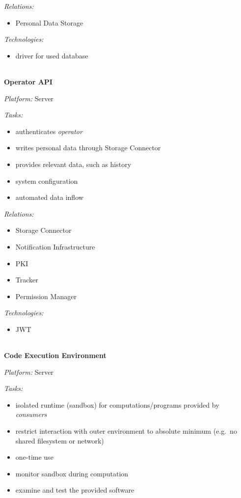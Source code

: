 \documentclass[12pt,english,a4paper,titlepage,cleardoublepage=empty,dottedtoc]{report}
\providecommand{\tightlist}{%
  \setlength{\itemsep}{0pt}\setlength{\parskip}{0pt}}
\begin{document}
\emph{Relations:}

\begin{itemize}
\tightlist
\item
  Personal Data Storage
\end{itemize}

\emph{Technologies:}

\begin{itemize}
\tightlist
\item
  driver for used database
\end{itemize}

~\\
\textbf{Operator API}

\emph{Platform:} Server

\emph{Tasks:}

\begin{itemize}
\tightlist
\item
  authenticates \emph{operator}
\item
  writes personal data through Storage Connector
\item
  provides relevant data, such as history
\item
  system configuration
\item
  automated data inflow
\end{itemize}

\emph{Relations:}

\begin{itemize}
\tightlist
\item
  Storage Connector
\item
  Notification Infrastructure
\item
  PKI
\item
  Tracker
\item
  Permission Manager
\end{itemize}

\emph{Technologies:}

\begin{itemize}
\tightlist
\item
  JWT
\end{itemize}

~\\
\textbf{Code Execution Environment}

\emph{Platform:} Server

\emph{Tasks:}

\begin{itemize}
\tightlist
\item
  isolated runtime (sandbox) for computations/programs provided by
  \emph{consumers}
\item
  restrict interaction with outer environment to absolute minimum
  (e.g.~no shared filesystem or network)
\item
  one-time use
\item
  monitor sandbox during computation
\item
  examine and test the provided software
\end{itemize}
\end{document}
